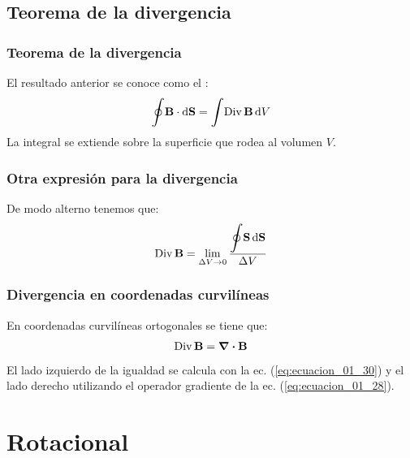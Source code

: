 \documentclass[12pt]{beamer}
\begin{document}
\subsection{Teorema de la divergencia}

\begin{frame}
\frametitle{Teorema de la divergencia}
El resultado anterior se conoce como el :
\pause
\begin{align}
\scaleoint{6ex} \vb{B} \cdot \dd{\vb{S}} = \scaleint{6ex} {\rm Div} \, \vb{B} \dd{V}
\label{eq:ecuacion_01_31}
\end{align}
La integral se extiende sobre la superficie que rodea al volumen $V$.
\end{frame}
\begin{frame}
\frametitle{Otra expresión para la divergencia}
De modo alterno tenemos que:
\pause
\begin{align*}
{\rm Div} \, \vb{B} = \lim_{\Delta V \to 0} \dfrac{\displaystyle \scaleoint{6ex} \vb{S} \dd{\vb{S}}}{\Delta V}
\end{align*}
\end{frame}
\begin{frame}
\frametitle{Divergencia en coordenadas curvilíneas}
En coordenadas curvilíneas ortogonales se tiene que:
\pause
\begin{align*}
{\rm Div} \, \vb{B} = \div{\vb{B}}
\end{align*}
\pause
El lado izquierdo de la igualdad se calcula con la ec. (\ref{eq:ecuacion_01_30}) y el lado derecho utilizando el operador gradiente de la ec. (\ref{eq:ecuacion_01_28}).
\end{frame}

\section{Rotacional}
\end{document}

